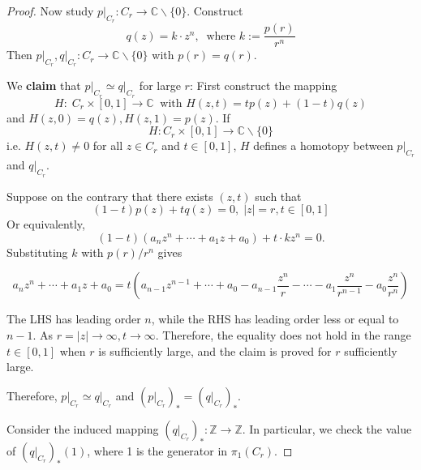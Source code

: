 \begin{proof}
Now study \({\left. p\right| }_{{C}_{r}}: {C}_{r} \rightarrow  \mathbb{C} \smallsetminus  \{ 0\}\). Construct
\[ q\left( z\right)  = k \cdot  {z}^{n},\ \text{ where } k \mathrel{\text{:= }} \frac{p\left( r\right) }{{r}^{n}}
\]
Then \({\left. p\right| }_{{C}_{r}},{\left. q\right| }_{{C}_{r}}: {C}_{r} \rightarrow  \mathbb{C} \smallsetminus  \{ 0\}\) with \(p\left( r\right)  = q\left( r\right)\).

We {\bf claim} that \({\left. p\right| }_{{C}_{r}} \simeq  {\left. q\right| }_{{C}_{r}}\) for large \(r\): First construct the mapping
\[
H: \;{C}_{r} \times  \left\lbrack  {0,1}\right\rbrack   \rightarrow  \mathbb{C}
\ \text{ with }H\left( {z,t}\right)  = {tp}\left( z\right)  + \left( {1 - t}\right) q\left( z\right)
\]
and $H\left( {z,0}\right)  = q\left( z\right),H\left( {z,1}\right)  = p\left( z\right)$. 
If 
\[H: {C}_{r} \times  \left\lbrack  {0,1}\right\rbrack   \rightarrow  \mathbb{C} \smallsetminus  \{ 0\}\]
i.e. $H(z,t) \neq 0$ for all $z \in C_r$ and $t \in [0,1]$, \(H\) defines a homotopy between \({\left. p\right| }_{{C}_{r}}\) and \({\left. q\right| }_{{C}_{r}}\).

Suppose on the contrary that there exists $(z, t)$ such that
\[
\left( {1 - t}\right) p\left( z\right)  + {tq}\left( z\right)  = 0,\;\left| z\right|  = r,t \in  \left\lbrack  {0,1}\right\rbrack
\]
Or equivalently,
\[
\left( {1 - t}\right) \left( {{a}_{n}{z}^{n} + \cdots  + {a}_{1}z + {a}_{0}}\right)  + t \cdot  k{z}^{n} = 0.
\]
Substituting \(k\) with \(p\left( r\right) /{r}^{n}\) gives

\[
{a}_{n}{z}^{n} + \cdots  + {a}_{1}z + {a}_{0} = t\left( {{a}_{n - 1}{z}^{n - 1} + \cdots  + {a}_{0} - {a}_{n - 1}\frac{{z}^{n}}{r} - \cdots  - {a}_{1}\frac{{z}^{n}}{{r}^{n - 1}} - {a}_{0}\frac{{z}^{n}}{{r}^{n}}}\right)
\]

The LHS has leading order \(n\), while the RHS has leading order less or equal to \(n - 1\). As \(r = \left| z\right|  \rightarrow  \infty,t \rightarrow  \infty\). Therefore, the equality does not hold in the range \(t \in  \left\lbrack  {0,1}\right\rbrack\) when \(r\) is sufficiently large, and the claim is proved for $r$ sufficiently large.

Therefore, \({\left. p\right| }_{{C}_{r}} \simeq  {\left. q\right| }_{{C}_{r}}\) and \({\left( {\left. p\right| }_{{C}_{r}}\right) }_{ * } = {\left( {\left. q\right| }_{{C}_{r}}\right) }_{ * }\). 

Consider the induced mapping \({\left( {\left. q\right| }_{{C}_{r}}\right) }_{ * }: \mathbb{Z} \rightarrow  \mathbb{Z}\). In particular, we check the value of \({\left( {\left. q\right| }_{{C}_{r}}\right) }_{ * }\left( 1\right)\), where 1 is the generator in \({\pi }_{1}\left( {C}_{r}\right)\).


\end{proof}
